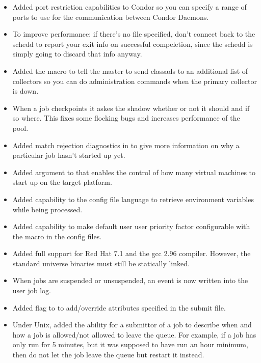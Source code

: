 \begin{itemize}
\item Added port restriction capabilities to Condor so you can specify a range
of ports to use for the communication between Condor Daemons.

\item To improve performance: if there's no  file
specified, don't connect back to the schedd to report your exit info on
successful compeletion, since the schedd is simply going to discard that
info anyway.

\item Added the macro  to tell the
master to send classads to an additional list of collectors so you can
do administration commands when the primary collector is down.

\item When a job checkpoints it askes the shadow whether or not it
should and if so where. This fixes some flocking bugs and increases
performance of the pool.

\item Added match rejection diagnostics in   to
give more information on why a particular job hasn't started up yet.

\item Added  argument to  that enables the
control of how many virtual machines to start up on the target platform.

\item Added capability to the config file language to retrieve environment
variables while being processed.

\item Added capability to make default user user priority factor configurable
with the  macro in the config files.

\item Added full support for Red Hat 7.1 and the gcc 2.96 compiler. However,
the standard universe binaries must still be statically linked.

\item When jobs are suspended or unsuspended, an event is now written into
the user job log.

\item Added  flag to  to add/override attributes
specified in the submit file.

\item Under Unix, added the ability for a submittor of a job to describe when
and how a job is allowed/not allowed to leave the queue. For example, if
a job has only run for 5 minutes, but it was supposed to have run an hour 
minimum, then do not let the job leave the queue but restart it instead.


\end{itemize}
